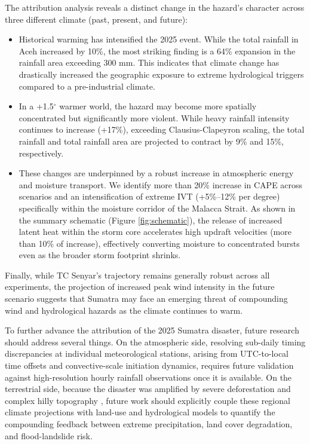 \documentclass[journal abbreviation, manuscript]{copernicus}
\begin{document}
The attribution analysis reveals a distinct change in the hazard's character across three different climate (past, present, and future):
\begin{itemize}
    \item Historical warming has intensified the 2025 event. While the total rainfall in Aceh increased by 10\%, the most striking finding is a 64\% expansion in the rainfall area exceeding 300 mm. This indicates that climate change has drastically increased the geographic exposure to extreme hydrological triggers compared to a pre-industrial climate.
    \item In a +1.5$^\circ$ warmer world, the hazard may become more spatially concentrated but significantly more violent. While heavy rainfall intensity continues to increase (+17\%), exceeding Clausius-Clapeyron scaling, the total rainfall and total rainfall area are projected to contract by 9\% and 15\%, respectively.
    \item These changes are underpinned by a robust increase in atmospheric energy and moisture transport. We identify more than 20\% increase in CAPE across scenarios and an intensification of extreme IVT (+5\%–12\% per degree) specifically within the moisture corridor of the Malacca Strait. As shown in the summary schematic (Figure \ref{fig:schematic}), the release of increased latent heat within the storm core accelerates high updraft velocities (more than 10\% of increase), effectively converting moisture to concentrated bursts even as the broader storm footprint shrinks.
\end{itemize}

Finally, while TC Senyar’s trajectory remains generally robust across all experiments, the projection of increased peak wind intensity in the future scenario suggests that Sumatra may face an emerging threat of compounding wind and hydrological hazards as the climate continues to warm.

To further advance the attribution of the 2025 Sumatra disaster, future research should address several things. On the atmospheric side, resolving sub-daily timing discrepancies at individual meteorological stations, arising from UTC-to-local time offsets and convective-scale initiation dynamics, requires future validation against high-resolution hourly rainfall observations once it is available. On the terrestrial side, because the disaster was amplified by severe deforestation and complex hilly topography \citep{wu2026analysis, wwa}, future work should explicitly couple these regional climate projections with land-use and hydrological models to quantify the compounding feedback between extreme precipitation, land cover degradation, and flood-landslide risk.
\end{document}
